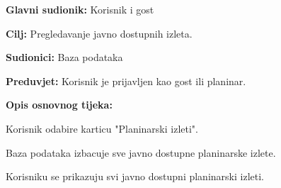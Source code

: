 	
		\noindent {}
		\begin{packed_item}
			
			\item \textbf{Glavni sudionik: } Korisnik i gost
			\item  \textbf{Cilj:} Pregledavanje javno dostupnih izleta.
			\item  \textbf{Sudionici:} Baza podataka
			\item  \textbf{Preduvjet:} Korisnik je prijavljen kao gost ili planinar.
			\item  \textbf{Opis osnovnog tijeka:}
			
			\item[] \begin{packed_enum}
				
				\item Korisnik odabire karticu "Planinarski izleti".
				\item Baza podataka izbacuje sve javno dostupne planinarske izlete.
				\item Korisniku se prikazuju svi javno dostupni planinarski izleti.
				
			\end{packed_enum}
		\end{packed_item}
		
		
		
